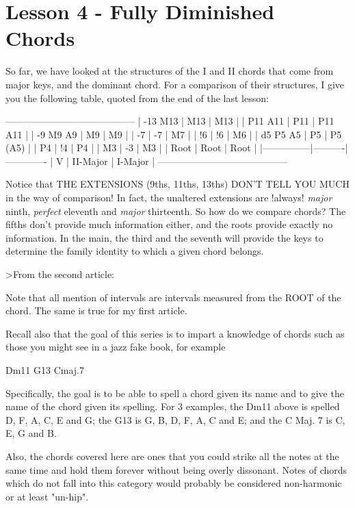 \section{Lesson 4 - Fully Diminished Chords}
So far, we have looked at the structures of the I and II chords that come
from major keys, and the dominant chord. For a comparison of their
structures, I give you the following table, quoted from the end of the last
lesson:

-----------------------------------------
| -13  M13      |   M13    |  M13       |
|      P11  A11 |   P11    |  P11  A11  |
|  -9   M9   A9 |    M9    |   M9       |
|       -7      |    -7    |   M7       |
|       !6      |    !6    |   M6       |
|  d5   P5   A5 |    P5    |   P5 (A5)  |
|       P4      |    !4    |   P4       |
|       M3      |    -3    |   M3       |
|      Root     |   Root   |  Root      |
|---------------|----------|-------------
|        V      | II-Major | I-Major    |
-----------------------------------------

Notice that THE EXTENSIONS (9ths, 11ths, 13ths) DON'T TELL YOU MUCH in the way
of comparison! In fact, the unaltered extensions are !always! \emph{major} ninth,
\emph{perfect} eleventh and \emph{major} thirteenth. So how do we compare chords? The
fifths don't provide much information either, and the roots provide exactly no
information. In the main, the third and the seventh will provide the keys to
determine the family identity to which a given chord belongs.

>From the second article:

Note that all mention of intervals are intervals measured from the ROOT
of the chord. The same is true for my first article.

Recall also that the goal of this series is to impart a knowledge of
chords such as those you might see in a jazz fake book, for example

Dm11     G13     Cmaj.7

Specifically, the goal is to be able to spell a chord given its name and
to give the name of the chord given its spelling. For 3 examples, the
Dm11 above is spelled D, F, A, C, E and G; the G13 is G, B, D, F, A, C
and E; and the C Maj. 7 is C, E, G and B.

Also, the chords covered here are ones that you could strike all the
notes at the same time and hold them forever without being overly
dissonant. Notes of chords which do not fall into this category would
probably be considered non-harmonic or at least "un-hip".

